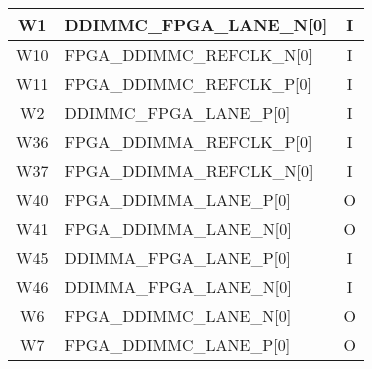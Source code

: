 \begin{longtable}[l]{| c | l | c |}
  W1   & DDIMMC\_FPGA\_LANE\_N[0]     & I   \\ \hline
  W10  & FPGA\_DDIMMC\_REFCLK\_N[0]   & I   \\ \hline
  W11  & FPGA\_DDIMMC\_REFCLK\_P[0]   & I   \\ \hline
  W2   & DDIMMC\_FPGA\_LANE\_P[0]     & I   \\ \hline
  W36  & FPGA\_DDIMMA\_REFCLK\_P[0]   & I   \\ \hline
  W37  & FPGA\_DDIMMA\_REFCLK\_N[0]   & I   \\ \hline
  W40  & FPGA\_DDIMMA\_LANE\_P[0]     & O   \\ \hline
  W41  & FPGA\_DDIMMA\_LANE\_N[0]     & O   \\ \hline
  W45  & DDIMMA\_FPGA\_LANE\_P[0]     & I   \\ \hline
  W46  & DDIMMA\_FPGA\_LANE\_N[0]     & I   \\ \hline
  W6   & FPGA\_DDIMMC\_LANE\_N[0]     & O   \\ \hline
  W7   & FPGA\_DDIMMC\_LANE\_P[0]     & O   \\ \hline
\end{longtable}
